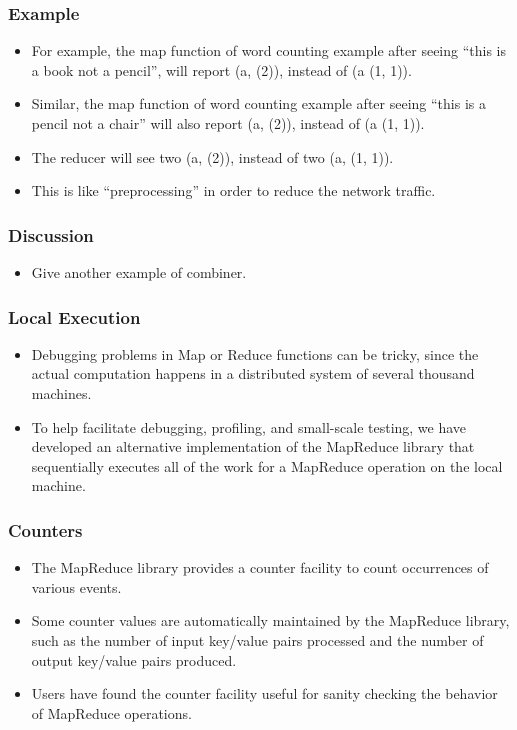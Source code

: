 \documentclass{beamer}
\begin{document}
\begin{frame}
  \frametitle{Example}
  \begin{itemize}
    \item For example, the map function of word counting example after
      seeing ``this is a book not a pencil'', will report (a, (2)),
      instead of (a (1, 1)).
    \item Similar, the map function of word counting example after
      seeing ``this is a pencil not a chair'' will also report (a,
      (2)), instead of (a (1, 1)).
    \item The reducer will see two (a, (2)), instead of two (a, (1,
      1)).
      \item This is like ``preprocessing'' in order to reduce the
        network traffic.
  \end{itemize}
\end{frame}

\begin{frame}
  \frametitle{Discussion}
  \begin{itemize}
    \item Give another example of combiner.
  \end{itemize}
\end{frame}

\begin{frame}
  \frametitle{Local Execution}
  \begin{itemize}
    \item Debugging problems in Map or Reduce functions can be tricky,
      since the actual computation happens in a distributed system of
      several thousand machines.
    \item To help facilitate debugging, profiling, and small-scale
      testing, we have developed an alternative implementation of
      the MapReduce library that sequentially executes all of the work
      for a MapReduce operation on the local machine.
  \end{itemize}
\end{frame}

\begin{frame}
  \frametitle{Counters}
  \begin{itemize}
    \item The MapReduce library provides a counter facility to count
      occurrences of various events.
    \item Some counter values are automatically maintained by the
      MapReduce library, such as the number of input key/value pairs
      processed and the number of output key/value pairs produced.
    \item Users have found the counter facility useful for sanity
      checking the behavior of MapReduce operations.
  \end{itemize}
\end{frame}
\end{document}
